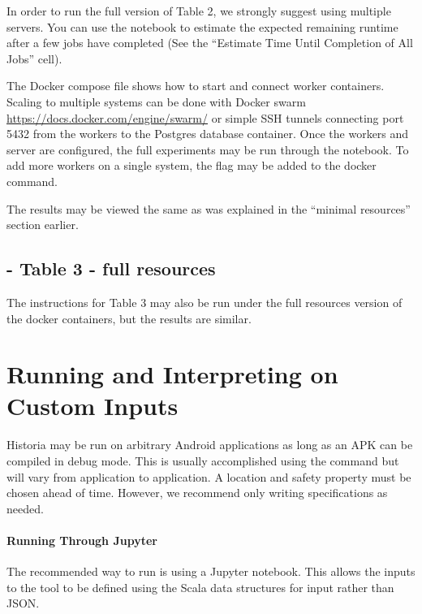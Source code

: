 \documentclass{acmart} %
\begin{document}
In order to run the full version of Table 2, we strongly suggest using multiple servers.
You can use the  notebook to estimate the expected remaining runtime after a few jobs have completed (See the ``Estimate Time Until Completion of All Jobs'' cell).

The Docker compose file  shows how to start and connect worker containers.  Scaling to multiple systems can be done with Docker swarm \url{https://docs.docker.com/engine/swarm/} or simple SSH tunnels connecting port 5432 from the workers to the Postgres database container. Once the workers and server are configured, the full experiments may be run through the  notebook.  To add more workers on a single system, the  flag may be added to the docker command.

The results may be viewed the same as was explained in the ``minimal resources'' section earlier.


\subsection{ - Table 3 - full resources}

The instructions for Table 3 may also be run under the full resources version of the docker containers, but the results are similar.

\iffalse
\section{Running and Interpreting \toolname on Custom Inputs}

Historia may be run on arbitrary Android applications as long as an APK can be compiled in debug mode.  This is usually accomplished using the command  but will vary from application to application. A location and safety property must be chosen ahead of time.  However, we recommend only writing \newls specifications as needed.

\paragraph{Running \toolname Through Jupyter}
The recommended way to run \toolname is using a Jupyter notebook.  This allows the inputs to the tool to be defined using the Scala data structures for input rather than JSON.
\end{document}
